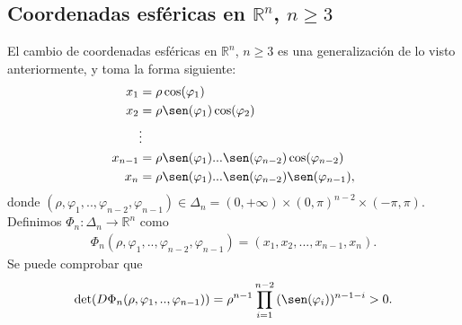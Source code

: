 \subsection{Coordenadas esféricas en $\mathbb{R}^n$, $n \ge 3$}
El cambio de coordenadas esféricas en $\mathbb{R}^n$, $n \ge 3$ es una generalización de lo visto anteriormente, y toma la forma siguiente:
\begin{align*}
    x_1     & = \rho \cos(\varphi_1)                                              \\
    x_2     & = \rho \sen(\varphi_1) \cos(\varphi_2)                              \\
            & \vdots                                                              \\
    x_{n-1} & =  \rho \sen(\varphi_1) ... \sen(\varphi_{n-2}) \cos(\varphi_{n-2}) \\
    x_{n}   & =  \rho \sen(\varphi_1) ...\sen(\varphi_{n-2}) \sen(\varphi_{n-1}),
\end{align*}
donde $(\rho, \varphi_1,..,\varphi_{n-2},\varphi_{n-1}) \in \Delta_n = (0,+\infty)\times(0,\pi)^{n-2}\times(-\pi,\pi)$. Definimos $\Phi_n : \Delta_n \longrightarrow \mathbb{R}^n$ como
\begin{align*}
    \Phi_n(\rho, \varphi_1,..,\varphi_{n-2},\varphi_{n-1}) = (x_1,x_2,...,x_{n-1},x_n).
\end{align*}
Se puede comprobar que
\begin{align*}
    \det(D\Phi_n(\rho, \varphi_1,..,\varphi_{n-1})) = \rho^{n-1}\prod_{i=1}^{n-2}{(\sen(\varphi_i))^{n-1-i}} > 0.
\end{align*}

